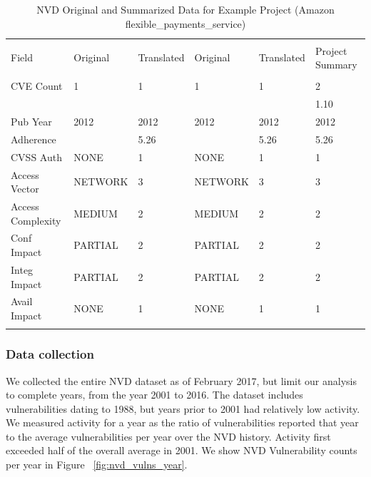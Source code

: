\begin{table}
	\begin{center}	
		\caption{NVD Original and Summarized Data for Example Project (Amazon flexible\_payments\_service)}
		\label{tab:nvd_data_examples}
		\begin{scriptsize}
			\begin{tabular}{p{3cm}p{1.5cm}p{1cm}p{1.5cm}p{1cm}p{1cm}}
				&&&&&\\[-1.8ex]\hline 
				\hline &&&&\\[-1.8ex] 
				Field & Original & Translated & Original & Translated & Project Summary \\
				\hline &&&&&\\[-1.8ex] 				
				CVE Count &  1 & 1 & 1 & 1 & 2\\
				&&&&& 1.10\\
				Pub Year & 2012 & 2012 & 2012 & 2012 & 2012\\
				Adherence & & 5.26 & & 5.26 & 5.26 \\				
				CVSS Auth & NONE & 1 & NONE & 1 & 1 \\
				Access Vector & NETWORK & 3 & NETWORK & 3 & 3 \\
				Access Complexity & MEDIUM & 2 & MEDIUM & 2 & 2 \\
				Conf Impact & PARTIAL & 2 & PARTIAL & 2 & 2\\
				Integ Impact & PARTIAL & 2 & PARTIAL & 2 & 2\\
				Avail Impact & NONE & 1 & NONE & 1 & 1 \\
				\hline &&&&&\\[-1.8ex] 		
			\end{tabular}
		\end{scriptsize}
	\end{center}
\end{table}
			
			
\subsubsection{Data collection}
We collected the entire NVD dataset as of February 2017, but limit our analysis to complete years, from the year 2001 to 2016. The dataset includes vulnerabilities dating to 1988, but years prior to 2001 had relatively low activity. We measured activity for a year as the ratio of vulnerabilities reported that year to the average vulnerabilities per year over the NVD history. Activity first exceeded half of the overall average in 2001. We show NVD Vulnerability counts per year in Figure ~\ref{fig:nvd_vulns_year}.

